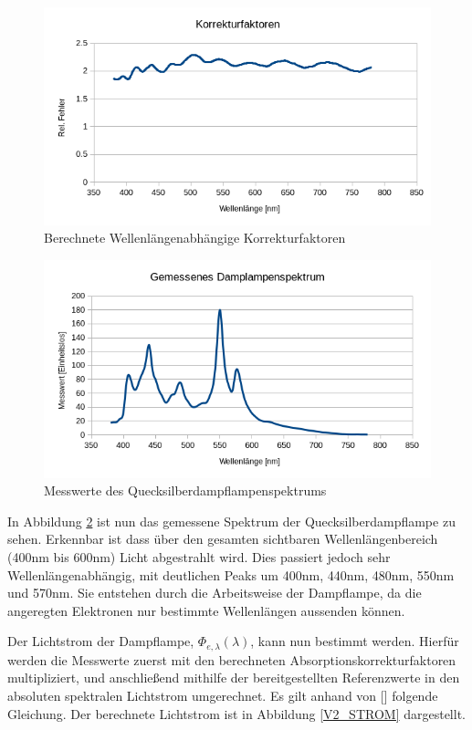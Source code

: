 \begin{figure}[h]
	\centering
	\includegraphics[scale=0.7]{Images/V2_Korr.png}
	\caption{Berechnete Wellenlängenabhängige Korrekturfaktoren}
	\label{V2_KOR}
\end{figure}

\begin{figure}[h]
	\centering
	\includegraphics[scale=0.7]{Images/V2_Dampflampe.png}
	\caption{Messwerte des Quecksilberdampflampenspektrums}
	\label{V2_QDL}
\end{figure}

In Abbildung \ref{V2_QDL} ist nun das gemessene Spektrum der Quecksilberdampflampe zu sehen. Erkennbar ist dass über den gesamten sichtbaren Wellenlängenbereich (400nm bis 600nm) Licht abgestrahlt wird. Dies passiert jedoch sehr Wellenlängenabhängig, mit deutlichen Peaks um 400nm, 440nm, 480nm, 550nm und 570nm. Sie entstehen durch die Arbeitsweise der Dampflampe, da die angeregten Elektronen nur bestimmte Wellenlängen aussenden können.

Der Lichtstrom der Dampflampe, $\Phi_{e,\lambda}(\lambda)$, kann nun bestimmt werden. Hierfür werden die Messwerte zuerst mit den berechneten Absorptionskorrekturfaktoren multipliziert, und anschließend mithilfe der bereitgestellten Referenzwerte in den absoluten spektralen Lichtstrom umgerechnet. Es gilt anhand von [\cite[Seite 22]{AML_SKRIPT}] folgende Gleichung. Der berechnete Lichtstrom ist in Abbildung \ref{V2_STROM} dargestellt.

